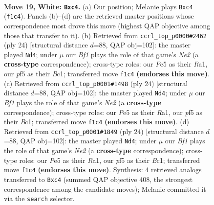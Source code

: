 \documentclass[11pt]{article}
\begin{document}
\clearpage

\begin{figure}[p]\centering
\begin{subfigure}{0.46\textwidth}\centering
\resizebox{\linewidth}{!}{%
\newchessgame
\chessboard[
  setfen={rnbq1kr1/1p2n3/4p3/1QP1Pp2/p1p2N2/P3B1p1/2P3PP/R3KB1R w KQ - 0 19},
  showmover=false,
  pgfstyle=straightmove, color=movearrow, markmove={f1-c4}
]}
\caption{}
\end{subfigure}\hfill
\begin{subfigure}{0.46\textwidth}\centering
\resizebox{\linewidth}{!}{%
\newchessgame
\chessboard[
  setfen={r3k1r1/ppqbnp2/n3p3/3pP3/5P2/P1pQ4/2P1N1PP/R1B1KB1R w KQq - 3 13},
  showmover=false,
  pgfstyle=straightmove, color=movearrow, markmove={e2-d4}
]}
\caption{}
\end{subfigure}
\\[4pt]
\begin{subfigure}{0.46\textwidth}\centering
\resizebox{\linewidth}{!}{%
\newchessgame
\chessboard[
  setfen={r3k1r1/ppqbnp2/n3p3/3pP3/5P2/P1pQ4/2P1N1PP/R1B1KB1R w KQq - 3 13},
  showmover=false,
  pgfstyle=straightmove, color=movearrow, markmove={e2-d4}
]}
\caption{}
\end{subfigure}\hfill
\begin{subfigure}{0.46\textwidth}\centering
\resizebox{\linewidth}{!}{%
\newchessgame
\chessboard[
  setfen={r3k1r1/ppqbnp2/n3p3/3pP3/5P2/P1pQ4/2P1N1PP/R1B1KB1R w KQq - 3 13},
  showmover=false,
  pgfstyle=straightmove, color=movearrow, markmove={e2-d4}
]}
\caption{}
\end{subfigure}
\caption{\textbf{Move 19, White: \texttt{Bxc4}.} (a) Our position; Melanie plays \texttt{Bxc4} (\texttt{f1c4}). Panels (b)--(d) are the retrieved master positions whose correspondence most drove this move (highest QAP objective among those that transfer to it). (b) Retrieved from \texttt{ccrl\_top\_p0000\#2462} (ply 24) [structural distance $d$=88, QAP obj=102]: the master played \texttt{Nd4}; under $\mu$ our \emph{Bf1} plays the role of that game's \emph{Ne2} (a \textbf{cross-type} correspondence); cross-type roles: our \emph{P}e5 as their \emph{R}a1, our \emph{p}f5 as their \emph{B}c1; transferred move \texttt{f1c4} \textbf{(endorses this move)}. (c) Retrieved from \texttt{ccrl\_top\_p0001\#1498} (ply 24) [structural distance $d$=88, QAP obj=102]: the master played \texttt{Nd4}; under $\mu$ our \emph{Bf1} plays the role of that game's \emph{Ne2} (a \textbf{cross-type} correspondence); cross-type roles: our \emph{P}e5 as their \emph{R}a1, our \emph{p}f5 as their \emph{B}c1; transferred move \texttt{f1c4} \textbf{(endorses this move)}. (d) Retrieved from \texttt{ccrl\_top\_p0001\#1849} (ply 24) [structural distance $d$=88, QAP obj=102]: the master played \texttt{Nd4}; under $\mu$ our \emph{Bf1} plays the role of that game's \emph{Ne2} (a \textbf{cross-type} correspondence); cross-type roles: our \emph{P}e5 as their \emph{R}a1, our \emph{p}f5 as their \emph{B}c1; transferred move \texttt{f1c4} \textbf{(endorses this move)}. Synthesis: 4 retrieved analogs transferred to \texttt{Bxc4} (summed QAP objective 408, the strongest correspondence among the candidate moves); Melanie committed it via the \texttt{search} selector.}

\end{figure}
\end{document}
